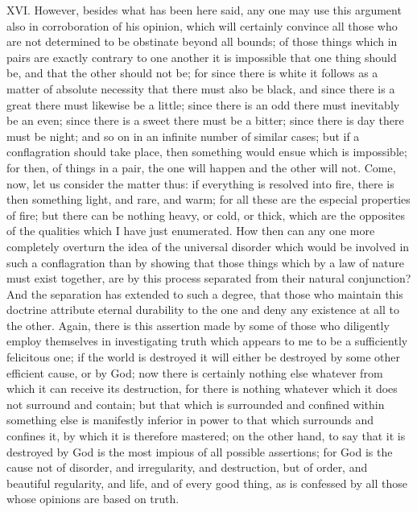 XVI. However, besides what has been here said, any one may use this argument also in
corroboration of his opinion, which will certainly convince all those who are not determined to be
obstinate beyond all bounds; of those things which in pairs are exactly contrary to one another it is
impossible that one thing should be, and that the other should not be; for since there is white it
follows as a matter of absolute necessity that there must also be black, and since there is a great
there must likewise be a little; since there is an odd there must inevitably be an even; since there is
a sweet there must be a bitter; since there is day there must be night; and so on in an infinite
number of similar cases; but if a conflagration should take place, then something would ensue
which is impossible; for then, of things in a pair, the one will happen and the other will not. Come,
now, let us consider the matter thus: if everything is resolved into fire, there is then something light,
and rare, and warm; for all these are the especial properties of fire; but there can be nothing
heavy, or cold, or thick, which are the opposites of the qualities which I have just enumerated. How
then can any one more completely overturn the idea of the universal disorder which would be
involved in such a conflagration than by showing that those things which by a law of nature must
exist together, are by this process separated from their natural conjunction? And the separation
has extended to such a degree, that those who maintain this doctrine attribute eternal durability to
the one and deny any existence at all to the other. Again, there is this assertion made by some of
those who diligently employ themselves in investigating truth which appears to me to be a
sufficiently felicitous one; if the world is destroyed it will either be destroyed by some other efficient
cause, or by God; now there is certainly nothing else whatever from which it can receive its
destruction, for there is nothing whatever which it does not surround and contain; but that which is
surrounded and confined within something else is manifestly inferior in power to that which
surrounds and confines it, by which it is therefore mastered; on the other hand, to say that it is
destroyed by God is the most impious of all possible assertions; for God is the cause not of
disorder, and irregularity, and destruction, but of order, and beautiful regularity, and life, and of
every good thing, as is confessed by all those whose opinions are based on truth.

